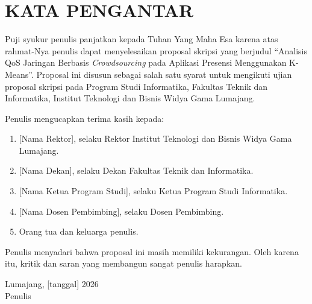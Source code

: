 \chapter*{KATA PENGANTAR}
{}

Puji syukur penulis panjatkan kepada Tuhan Yang Maha Esa karena atas rahmat-Nya penulis dapat menyelesaikan proposal skripsi yang berjudul ``Analisis QoS Jaringan Berbasis \textit{Crowdsourcing} pada Aplikasi Presensi Menggunakan K-Means''. Proposal ini disusun sebagai salah satu syarat untuk mengikuti ujian proposal skripsi pada Program Studi Informatika, Fakultas Teknik dan Informatika, Institut Teknologi dan Bisnis Widya Gama Lumajang.

Penulis mengucapkan terima kasih kepada:
\begin{enumerate}[topsep=0pt,itemsep=0pt]
    \item {[Nama Rektor]}, selaku Rektor Institut Teknologi dan Bisnis Widya Gama Lumajang.
    \item {[Nama Dekan]}, selaku Dekan Fakultas Teknik dan Informatika.
    \item {[Nama Ketua Program Studi]}, selaku Ketua Program Studi Informatika.
    \item {[Nama Dosen Pembimbing]}, selaku Dosen Pembimbing.
    \item Orang tua dan keluarga penulis.
\end{enumerate}

Penulis menyadari bahwa proposal ini masih memiliki kekurangan. Oleh karena itu, kritik dan saran yang membangun sangat penulis harapkan.

\vspace{1cm}
\begin{flushright}
Lumajang, [tanggal] 2026\\[2cm]
Penulis
\end{flushright}
